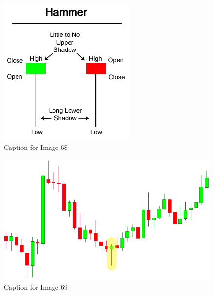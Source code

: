 \documentclass{article}
\begin{document}
\begin{figure}[!htb]
    \centering
    \includegraphics[width=\textwidth]{imgs/68.png}
    \caption{Caption for Image 68}
\end{figure}

\vspace{10pt}

\begin{figure}[!htb]
    \centering
    \includegraphics[width=\textwidth]{imgs/69.png}
    \caption{Caption for Image 69}
\end{figure}
\end{document}
